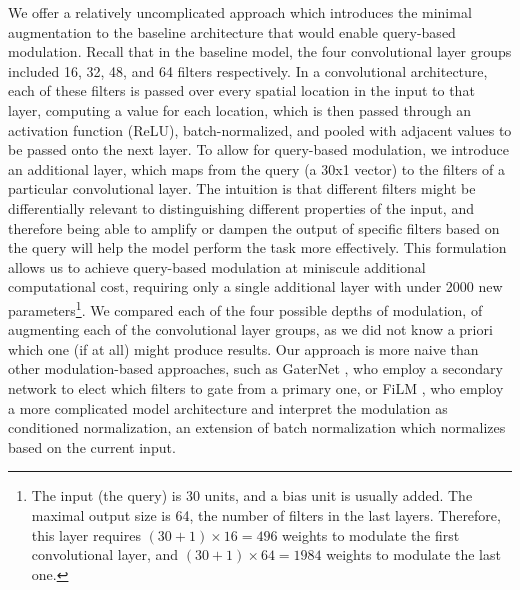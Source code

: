 We offer a relatively uncomplicated approach which introduces the minimal augmentation to the baseline architecture that would enable query-based modulation. Recall that in the baseline model, the four convolutional layer groups included 16, 32, 48, and 64 filters respectively. In a convolutional architecture, each of these filters is passed over every spatial location in the input to that layer, computing a value for each location, which is then passed through an activation function (ReLU), batch-normalized, and pooled with adjacent values to be passed onto the next layer. To allow for query-based modulation, we introduce an additional layer, which maps from the query (a 30x1 vector) to the filters of a particular convolutional layer. The intuition is that different filters might be differentially relevant to distinguishing different properties of the input, and therefore being able to amplify or dampen the output of specific filters based on the query will help the model perform the task more effectively. This formulation allows us to achieve query-based modulation at miniscule additional computational cost, requiring only a single additional layer with under 2000 new parameters\footnote{The input (the query) is 30 units, and a bias unit is usually added. The maximal output size is 64, the number of filters in the last layers. Therefore, this layer requires $(30 + 1) \times 16 = 496$ weights to modulate the first convolutional layer, and $(30 + 1) \times 64 = 1984$ weights to modulate the last one.}. We compared each of the four possible depths of modulation, of augmenting each of the convolutional layer groups, as we did not know a priori which one (if at all) might produce results. Our approach is more naive than other modulation-based approaches, such as GaterNet \parencite{Chen}, who employ a secondary network to elect which filters to gate from a primary one, or FiLM \parencite{Perez2017,Dumoulin2018}, who employ a more complicated model architecture and interpret the modulation as conditioned normalization, an extension of batch normalization which normalizes based on the current input.   


